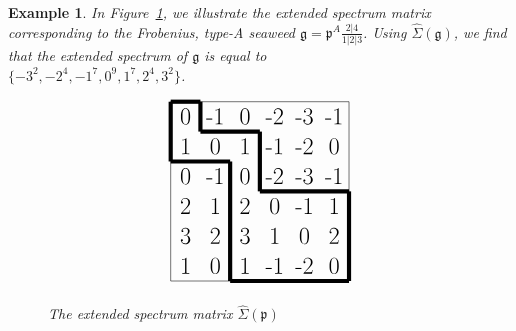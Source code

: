 \documentclass[letterpaper,10pt]{article}
\newtheorem{Ex}[theorem]{Example}
\begin{document}
\begin{Ex}\label{ex:meanderexteigen}
In Figure~\ref{fig:extspec}, we illustrate the extended spectrum matrix corresponding to the Frobenius, type-A seaweed $\mathfrak{g}=\mathfrak{p}^A\frac{2|4}{1|2|3}$. Using $\widehat{\Sigma}(\mathfrak{g})$, we find that the extended spectrum of $\mathfrak{g}$ is equal to\\ $\{-3^2,-2^4,-1^7,0^9,1^7,2^4,3^2\}$.
\begin{figure}[H]
$$\begin{tikzpicture}[scale=0.75]
\draw (0,0) -- (0,6);
\draw (0,6) -- (6,6);
\draw (6,6) -- (6,0);
\draw (6,0) -- (0,0);
\draw [line width=3](0,6) -- (0,4);
\draw [line width=3](0,4) -- (2,4);
\draw [line width=3](2,4) -- (2,0);
\draw [line width=3](2,0) -- (6,0);


\draw [line width=3](0,6) -- (1,6);
\draw [line width=3](1,6) -- (1,5);
\draw [line width=3](1,5) -- (3,5);
\draw [line width=3](3,5) -- (3,3);
\draw [line width=3](3,3) -- (6,3);
\draw [line width=3](6,3) -- (6,0);


\node at (.5,5.5) {{\LARGE 0}};
\node at (1.5,5.5) {{\LARGE -1}};
\node at (2.5,5.5) {{\LARGE 0}};
\node at (3.5,5.5) {{\LARGE -2}};
\node at (4.5,5.5) {{\LARGE -3}};
\node at (5.5,5.5) {{\LARGE -1}};
\node at (.5,4.5) {{\LARGE 1}};
\node at (1.5,4.5) {{\LARGE 0}};
\node at (2.5,4.5) {{\LARGE 1}};
\node at (3.5,4.5) {{\LARGE -1}};
\node at (4.5,4.5) {{\LARGE -2}};
\node at (5.5,4.5) {{\LARGE 0}};
\node at (0.5,3.5) {{\LARGE 0}};
\node at (1.5,3.5) {{\LARGE -1}};
\node at (2.5,3.5) {{\LARGE 0}};
\node at (3.5,3.5) {{\LARGE -2}};
\node at (4.5,3.5) {{\LARGE -3}};
\node at (5.5,3.5) {{\LARGE -1}};
\node at (2.5,2.5) {{\LARGE 2}};
\node at (0.5,2.5) {{\LARGE 2}};
\node at (1.5,2.5) {{\LARGE 1}};
\node at (0.5,1.5) {{\LARGE 3}};
\node at (1.5,1.5) {{\LARGE 2}};
\node at (2.5,1.5) {{\LARGE 3}};
\node at (0.5,0.5) {{\LARGE 1}};
\node at (1.5,0.5) {{\LARGE 0}};
\node at (2.5,0.5) {{\LARGE 1}};
\node at (3.5,2.5) {{\LARGE 0}};
\node at (3.5,1.5) {{\LARGE 1}};
\node at (3.5,0.5) {{\LARGE -1}};
\node at (4.5,2.5) {{\LARGE -1}};
\node at (4.5,1.5) {{\LARGE 0}};
\node at (5.5,2.5) {{\LARGE 1}};
\node at (5.5,1.5) {{\LARGE 2}};
\node at (4.5,0.5) {{\LARGE -2}};
\node at (5.5,0.5) {{\LARGE 0}};
\end{tikzpicture}$$
\caption{The extended spectrum matrix $\widehat{\Sigma}(\mathfrak{p})$}\label{fig:seaweedexteigen}
\label{fig:extspec}
\end{figure}
\end{Ex}
\end{document}
